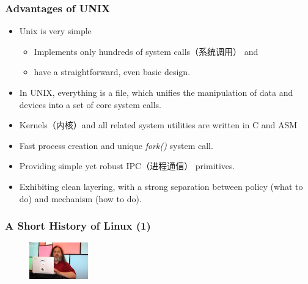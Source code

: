 \documentclass[red]{beamer}
\begin{document}
\begin{CJK*}{UTF8}{gbsn}
\begin{frame}
\frametitle{Advantages of UNIX}
\begin{itemize}
    \item Unix is very simple
    \begin{itemize}
        \item Implements only hundreds of system calls（系统调用） and
        \item have a straightforward, even basic design.
    \end{itemize}
    \item In UNIX, everything is a file, which unifies the manipulation
        of data and devices into a set of core system calls.
    \item Kernels（内核）and all related system utilities are written in C and ASM
    \item Fast process creation and unique \emph{fork()} system call.
    \item Providing simple yet robust IPC（进程通信） primitives.
    \item Exhibiting clean layering, with a strong separation between policy (what to do) 
		and mechanism (how to do).
\end{itemize}
\end{frame}

\begin{frame}
\frametitle{A Short History of Linux (1)}
\begin{figure}
  \includegraphics[width=1in]{images/stallman.jpg}
\end{figure}


\end{frame}
\end{CJK*}
\end{document}
